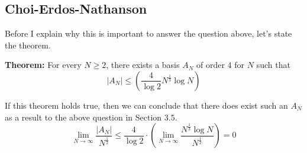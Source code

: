\documentclass[8pt]{extarticle}
\begin{document}
\subsection{Choi-Erdos-Nathanson}
Before I explain why this is important to answer the question above, let's state the theorem. 
\begin{boxedsection}
    \textbf{Theorem:} For every $N \geq 2$, there exists a basis $A_N$ of order $4$ for $N$ such that
    $$
    |A_N| \leq \left(\frac{4}{\log 2}N^{\frac{1}{3}} \log N\right) 
    $$
\end{boxedsection}
If this theorem holds true, then we can conclude that there does exist such an $A_N$ as a result to the above question in Section $3.5$.
$$
\lim_{N\rightarrow\infty} \frac{|A_N|}{N^{\frac{1}{2}}} \leq \frac{4}{\log 2} \cdot \left( \lim_{N\rightarrow\infty}  \frac{N^{\frac{1}{3}} \log N }{N^{\frac{1}{2}}} \right) = 0 
$$
\end{document}

